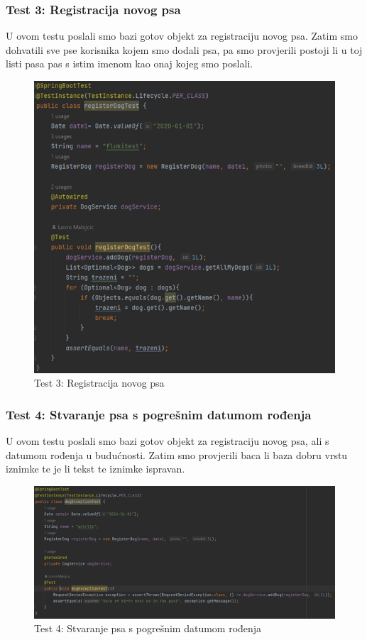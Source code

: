 				\subsubsection{Test 3: Registracija novog psa}
				
				U ovom testu poslali smo bazi gotov objekt za registraciju novog psa. Zatim smo dohvatili sve pse korisnika kojem smo dodali psa, pa smo provjerili postoji li u toj listi pasa pas s istim imenom kao onaj kojeg smo poslali.
				
				\begin{figure}[H]
					\centering
					\includegraphics[width=12cm]{slike/registracijaNovogPsa}
					\caption{Test 3: Registracija novog psa}
					\label{fig:Test-3}
				\end{figure}
			
				\subsubsection{Test 4: Stvaranje psa s pogrešnim datumom rođenja}
				
				U ovom testu poslali smo bazi gotov objekt za registraciju novog psa, ali s datumom rođenja u budućnosti. Zatim smo provjerili baca li baza dobru vrstu iznimke te je li tekst te iznimke ispravan.
				
				\begin{figure}[H]
					\centering
					\includegraphics[width=12cm]{slike/stvaranjePsaSKrivimDatumom}
					\caption{Test 4: Stvaranje psa s pogrešnim datumom rođenja}
					\label{fig:Test-4}
				\end{figure}
			
